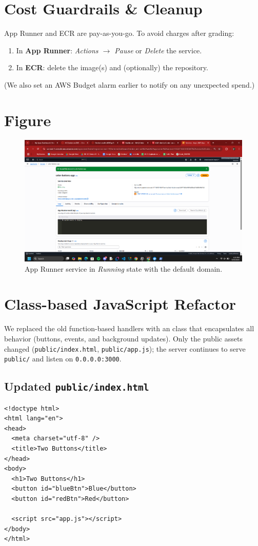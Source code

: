 \section*{Cost Guardrails \& Cleanup}
App Runner and ECR are pay-as-you-go. To avoid charges after grading:
\begin{enumerate}
  \item In \textbf{App Runner}: \emph{Actions $\rightarrow$ Pause} or \emph{Delete} the service.
  \item In \textbf{ECR}: delete the image(s) and (optionally) the repository.
\end{enumerate}
(We also set an AWS Budget alarm earlier to notify on any unexpected spend.)

\section*{Figure}
\begin{figure}[htbp]
  \centering
  \includegraphics[width=.95\linewidth]{png/docker/app-runner-running.png}
  \caption{App Runner service in \emph{Running} state with the default domain.}
\end{figure}

\section*{Class-based JavaScript Refactor}

We replaced the old function-based handlers with an class that encapsulates all behavior (buttons, events, and background updates). Only the public assets changed (\texttt{public/index.html}, \texttt{public/app.js}); the server continues to serve \texttt{public/} and listen on \texttt{0.0.0.0:3000}.

\subsection*{Updated \texttt{public/index.html}}
\begin{verbatim}
<!doctype html>
<html lang="en">
<head>
  <meta charset="utf-8" />
  <title>Two Buttons</title>
</head>
<body>
  <h1>Two Buttons</h1>
  <button id="blueBtn">Blue</button>
  <button id="redBtn">Red</button>

  <script src="app.js"></script>
</body>
</html>
\end{verbatim}

